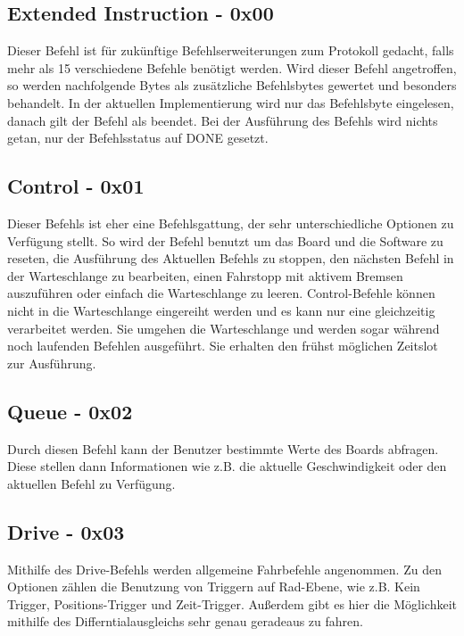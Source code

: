 \documentclass[a4paper]{article}
\begin{document}
	\subsection{Extended Instruction - 0x00}

	Dieser Befehl ist für zukünftige Befehlserweiterungen zum Protokoll gedacht, falls mehr als 15 verschiedene Befehle
	benötigt werden. Wird dieser Befehl angetroffen, so werden nachfolgende Bytes als zusätzliche Befehlsbytes gewertet
	und besonders behandelt.
	In der aktuellen Implementierung wird nur das Befehlsbyte eingelesen, danach gilt der Befehl als beendet. Bei der
	Ausführung des Befehls wird nichts getan, nur der Befehlsstatus auf DONE gesetzt.

	\subsection{Control - 0x01}

	Dieser Befehls ist eher eine Befehlsgattung, der sehr unterschiedliche Optionen zu Verfügung stellt. So wird der
	Befehl benutzt um das Board und die Software zu reseten, die Ausführung des Aktuellen Befehls zu stoppen, den
	nächsten Befehl in der Warteschlange zu bearbeiten, einen Fahrstopp mit aktivem Bremsen auszuführen oder einfach die
	Warteschlange zu leeren. 
	Control-Befehle können nicht in die Warteschlange eingereiht werden und es kann nur eine gleichzeitig verarbeitet werden.
	Sie umgehen die Warteschlange und werden sogar während noch laufenden Befehlen ausgeführt. Sie erhalten den frühst
	möglichen Zeitslot zur Ausführung.

	\subsection{Queue - 0x02}

	Durch diesen Befehl kann der Benutzer bestimmte Werte des Boards abfragen. Diese stellen dann Informationen
	wie z.B. die aktuelle Geschwindigkeit oder den aktuellen Befehl zu Verfügung.

	\subsection{Drive - 0x03}

	Mithilfe des Drive-Befehls werden allgemeine Fahrbefehle angenommen. Zu den Optionen zählen die Benutzung von Triggern
	auf Rad-Ebene, wie z.B. Kein Trigger, Positions-Trigger und Zeit-Trigger. Außerdem gibt es hier die Möglichkeit
	mithilfe des Differntialausgleichs sehr genau geradeaus zu fahren.
\end{document}
